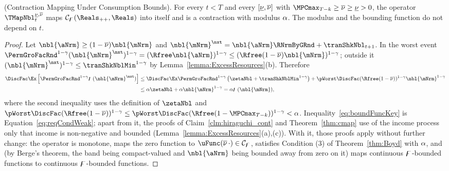 \documentclass[\econtexRoot/BufferStockTheory]{subfiles}
\begin{document}
\begin{theorem}(Contraction Mapping Under Consumption Bounds).\label{thm:cmapPositiveMinimum}
For every $t<T$ and every $[\underline{\nu},\overline{\nu}]$ with $\MPCmax_{T-k}\geq\MPCmaxInf\geq\MPCminInf>0$, the operator $\TMapNbl_{t}^{\MPCminInf,\MPCmaxInf}$ maps $\mathcal{C}_{\boundFunc}(\Reals_{++},\Reals)$ into itself and is a contraction with modulus $\alpha$.
The modulus and the bounding function do not depend on $t$.
\end{theorem}

\begin{proof}
Let $\nbl{\aNrm}\geq(1-\MPCmaxInf)\nbl{\mNrm}$ and $\nbl{\mNrm}^{\nxt}=\nbl{\aNrm}\RNrmByGRnd+\tranShkNbl_{t+1}$.
In the worst event $\PermGroFacRnd^{1-\CRRA}(\nbl{\mNrm}^{\nxt})^{1-\CRRA}=(\Rfree\nbl{\aNrm})^{1-\CRRA}\leq(\Rfree(1-\MPCmaxInf)\nbl{\mNrm})^{1-\CRRA}$; outside it $(\nbl{\mNrm}^{\nxt})^{1-\CRRA}\leq\tranShkNblMin^{1-\CRRA}$ by Lemma~\ref{lemma:ExcessResources}(b).
Therefore
\begin{equation}\label{eq:boundFuncKey}
  \begin{aligned}
  \DiscFac\Ex\left[\PermGroFacRnd^{1-\CRRA}\boundFunc(\nbl{\mNrm}^{\nxt})\right]
  & \leq\DiscFac\Ex\PermGroFacRnd^{1-\CRRA}\left(\zetaNbl+\tranShkNblMin^{1-\CRRA}\right)+\pWorst\DiscFac(\Rfree(1-\MPCmaxInf))^{1-\CRRA}\nbl{\mNrm}^{1-\CRRA} \\
  & \leq\Shrinker\zetaNbl+\Shrinker\nbl{\mNrm}^{1-\CRRA}=\Shrinker\boundFunc(\nbl{\mNrm}),
  \end{aligned}
\end{equation}
where the second inequality uses the definition of $\zetaNbl$ and $\pWorst\DiscFac(\Rfree(1-\MPCmaxInf))^{1-\CRRA}\leq\pWorst\DiscFac(\Rfree(1-\MPCmax_{T-k}))^{1-\CRRA}<\Shrinker$.
Inequality~\eqref{eq:boundFuncKey} is Equation~\eqref{eq:reqCondWeak}; apart from it, the proofs of Claim~\ref{clm:hiraguchi_cont} and Theorem~\ref{thm:cmap} use of the income process only that income is non-negative and bounded (Lemma~\ref{lemma:ExcessResources}(a),(c)).
With it, those proofs apply without further change: the operator is monotone, maps the zero function to $\uFunc(\MPCmaxInf\,\cdot)\in\mathcal{C}_{\boundFunc}$, satisfies Condition (3) of Theorem~\ref{thm:Boyd} with $\alpha$, and (by Berge's theorem, the band being compact-valued and $\nbl{\aNrm}$ being bounded away from zero on it) maps continuous $\digamma$-bounded functions to continuous $\digamma$-bounded functions.
\end{proof}
\end{document}

